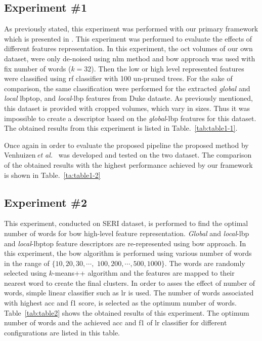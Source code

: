 \subsection{Experiment \#1}\label{subsec:exp1}
As previously stated, this experiment was performed with our primary framework which is presented in \cite{Lemaintre2015miccaiOCT}.
This experiment was performed to evaluate the effects of different features representation.
In this experiment, the \ac{oct} volumes of our own dataset, were only de-noised using \ac{nlm} method and \ac{bow} approach was used with fix number of words ($k = 32$).
Then the low or high level represented features were classified using \ac{rf} classifier with 100 un-pruned trees.  
For the sake of comparison, the same classification were performed for the extracted \emph{global} and \emph{local} \ac{lbptop}, and \emph{local}-\ac{lbp} features from Duke dataste.
As previously mentioned, this dataset is provided with cropped volumes, which vary in sizes.
Thus it was impossible to create a descriptor based on the \emph{global}-\ac{lbp} features for this dataset.
The obtained results from this experiment is listed in Table.~\ref{tab:table1-1}.


Once again in order to evaluate the proposed pipeline the proposed method by Venhuizen\,\textit{et al.}~\cite{Venhuizen2015} was developed and tested on the two dataset. The comparison of the obtained results with the highest performance achieved by our framework is shown in Table.~\ref{ta:table1-2}
\label{subsec:exp2}

\subsection{Experiment \#2}
This experiment, conducted on SERI dataset, is performed to find the optimal number of words for \ac{bow} high-level feature representation.
\emph{Global} and \emph{local}-\ac{lbp} and \emph{local}-\ac{lbptop} feature descriptors are re-represented using \ac{bow} approach.
In this experiment, the \ac{bow} algorithm is performed using various number of words in the range of $\{10, 20, 30, \cdots,$
 $100, 200, \cdots, 500, 1000\}$.
The words are randomly selected using $k$-means++ algorithm and the features are mapped to their nearest word to create the final clusters.
In order to asses the effect of number of words, simple linear classifier such as \ac{lr} is used.
The number of words associated with highest \ac{acc} and \ac{f1} score, is selected as the optimum number of words.
Table~\ref{tab:table2} shows the obtained results of this experiment.
The optimum number of words and the achieved \ac{acc} and \ac{f1} of \ac{lr} classifier for different configurations are listed in this table.

